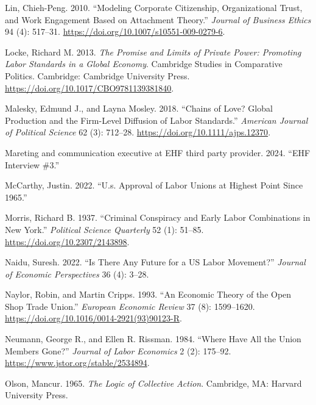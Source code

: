 \documentclass[
  11pt,
  oneside]{article}
\newlength{\cslhangindent}
\newenvironment{CSLReferences}[2] %
 {\begin{list}{}{%
  \setlength{\itemindent}{0pt}
  \setlength{\leftmargin}{0pt}
  \setlength{\parsep}{0pt}
  \ifodd #1
   \setlength{\leftmargin}{\cslhangindent}
   \setlength{\itemindent}{-1\cslhangindent}
  \fi
  \setlength{\itemsep}{#2\baselineskip}}}
 {\end{list}}
\begin{document}
\begin{CSLReferences}{1}{0}
Lin, Chieh-Peng. 2010. {``Modeling {Corporate} {Citizenship}, {Organizational} {Trust}, and {Work} {Engagement} {Based} on {Attachment} {Theory}.''} \emph{Journal of Business Ethics} 94 (4): 517--31. \url{https://doi.org/10.1007/s10551-009-0279-6}.

Locke, Richard M. 2013. \emph{The {Promise} and {Limits} of {Private} {Power}: {Promoting} {Labor} {Standards} in a {Global} {Economy}}. Cambridge {Studies} in {Comparative} {Politics}. Cambridge: Cambridge University Press. \url{https://doi.org/10.1017/CBO9781139381840}.

Malesky, Edmund J., and Layna Mosley. 2018. {``Chains of {Love}? {Global} {Production} and the {Firm}-{Level} {Diffusion} of {Labor} {Standards}.''} \emph{American Journal of Political Science} 62 (3): 712--28. \url{https://doi.org/10.1111/ajps.12370}.

Mareting and communication executive at EHF third party provider. 2024. {``{EHF} Interview \#3.''}

McCarthy, Justin. 2022. {``U.s. Approval of Labor Unions at Highest Point Since 1965.''}

Morris, Richard B. 1937. {``Criminal {Conspiracy} and {Early Labor Combinations} in {New York}.''} \emph{Political Science Quarterly} 52 (1): 51--85. \url{https://doi.org/10.2307/2143898}.

Naidu, Suresh. 2022. {``Is There Any Future for a {US} {Labor} {Movement}?''} \emph{Journal of Economic Perspectives} 36 (4): 3--28.

Naylor, Robin, and Martin Cripps. 1993. {``An Economic Theory of the Open Shop Trade Union.''} \emph{European Economic Review} 37 (8): 1599--1620. \url{https://doi.org/10.1016/0014-2921(93)90123-R}.

Neumann, George R., and Ellen R. Rissman. 1984. {``Where {Have All} the {Union Members Gone}?''} \emph{Journal of Labor Economics} 2 (2): 175--92. \url{https://www.jstor.org/stable/2534894}.

Olson, Mancur. 1965. \emph{The {Logic} of {Collective} {Action}}. Cambridge, MA: Harvard University Press.


\end{CSLReferences}
\end{document}
